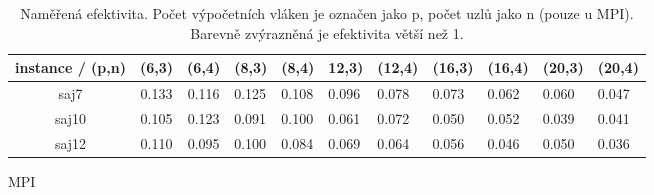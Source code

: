 \documentclass{article}
\begin{document}
\begin{table}[h]
        \begin{subtable}{.5\linewidth}\centering
        \centering
        \begin{tabular}{|c|c|c|l|l|l|l|l|l|l|l|}
            \hline
            \textbf{instance / (p,n)} &
            \textbf{(6,3)} &
            \textbf{(6,4)} &
            \multicolumn{1}{c|}{\textbf{(8,3)}} &
            \multicolumn{1}{c|}{\textbf{(8,4)}} &
            \textbf{12,3)} &
            \textbf{(12,4)} &
            \textbf{(16,3)} &
            \textbf{(16,4)} &
            \textbf{(20,3)} &
            \textbf{(20,4)} \\ \hline
            saj7  & 0.133 & 0.116 & 0.125 & 0.108 & 0.096 & 0.078 & 0.073 & 0.062 & 0.060 & 0.047 \\ \hline
            saj10 & 0.105 & 0.123 & 0.091 & 0.100 & 0.061 & 0.072 & 0.050 & 0.052 & 0.039 & 0.041 \\ \hline
            saj12 & 0.110 & 0.095 & 0.100 & 0.084 & 0.069 & 0.064 & 0.056 & 0.046 & 0.050 & 0.036 \\ \hline
        \end{tabular}
        \caption{MPI}
        \label{tab:efektivita-mpi}
        \end{subtable}

        \caption{Naměřená efektivita. Počet výpočetních vláken je označen jako p, počet uzlů jako n (pouze u MPI). Barevně zvýrazněná je efektivita větší než 1.}
        \label{tab:efektivita}
    \end{table}
\end{document}
